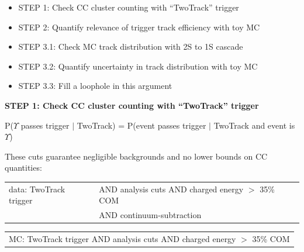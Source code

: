 \documentclass[landscape]{article}
\begin{document}
\vfill

\renewcommand{\labelitemi}{}
\begin{itemize}

  \item {STEP 1: Check CC cluster counting with ``TwoTrack'' trigger}

  \item {STEP 2: Quantify relevance of trigger track efficiency with toy MC}

  \item {STEP 3.1: Check MC track distribution with 2S to 1S cascade}

  \item {STEP 3.2: Quantify uncertainty in track distribution with toy MC}

  \item {STEP 3.3: Fill a loophole in this argument}

\end{itemize}
\renewcommand{\labelitemi}{-}

\vfill

\pagebreak

\vspace{1 cm}

{\bf STEP 1: Check CC cluster counting with ``TwoTrack'' trigger}

\vfill

P($\Upsilon$ passes trigger $|$ TwoTrack) = P(event passes trigger $|$ TwoTrack and event is $\Upsilon$)

\vfill

These cuts guarantee negligible backgrounds and no lower bounds on CC quantities:

\vspace{0.5 cm}

\begin{center}
  \begin{tabular}{l l}
    data: TwoTrack trigger & \hspace{-0.4 cm} AND analysis cuts AND charged energy $>$ 35\% COM \\
    & \hspace{-0.4 cm} AND continuum-subtraction
  \end{tabular}

  \medskip
  \begin{tabular}{l}
    MC: TwoTrack trigger AND analysis cuts AND charged energy $>$ 35\% COM
  \end{tabular}
\end{center}
\end{document}
